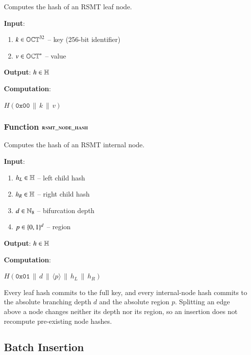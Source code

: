 Computes the hash of an RSMT leaf node.

\textbf{Input}:
\begin{enumerate}
	\item $k \in \mathbb{OCT}^{32}$ -- key (256-bit identifier)
	\item $v \in \mathbb{OCT}^{\ast}$ -- value
\end{enumerate}

\textbf{Output}: $h \in \mathbb{H}$

\textbf{Computation}:
\begin{algorithmic}
		\State \Return $H(\mathtt{0x00} \,\|\, k \,\|\, v)$
	\EndFunction
\end{algorithmic}

\subsubsection{Function $\textsc{rsmt\_node\_hash}$}\label{sec:rsmt-node-hash}

Computes the hash of an RSMT internal node.

\textbf{Input}:
\begin{enumerate}
	\item $h_L \in \mathbb{H}$ -- left child hash
	\item $h_R \in \mathbb{H}$ -- right child hash
	\item $d \in \mathbb{N}_{8}$ -- bifurcation depth
	\item $p \in \{0,1\}^{d}$ -- region
\end{enumerate}

\textbf{Output}: $h \in \mathbb{H}$

\textbf{Computation}:
\begin{algorithmic}
		\State \Return $H(\mathtt{0x01} \,\|\, d \,\|\, \langle p \rangle \,\|\, h_L \,\|\, h_R)$
	\EndFunction
\end{algorithmic}

Every leaf hash commits to the full key, and every internal-node hash commits to the absolute branching depth $d$ and the absolute region $p$. Splitting an edge above a node changes neither its depth nor its region, so an insertion does not recompute pre-existing node hashes.

\subsection{Batch Insertion}\label{sec:rsmt-batch-insert}


